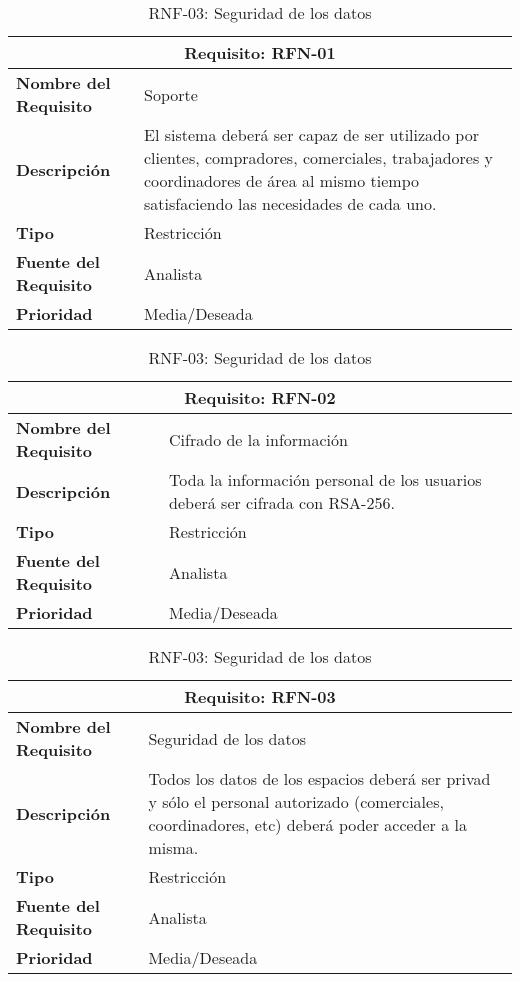\begin{table}[H]
\begin{table}[H]
\begin{center}
\begin{tabular}{p{} p{7cm}}
\multicolumn{2}{c}{\textbf{Requisito: RFN-01} } \\
\hline \hline
\textbf{Nombre del Requisito} & Soporte  \\
\hline
\textbf{Descripción} & El sistema deberá ser capaz de ser utilizado por clientes, compradores, comerciales, trabajadores y coordinadores de área al mismo tiempo satisfaciendo las necesidades de cada uno. \\
\hline
\textbf{Tipo} & Restricción \\
\hline
\textbf{Fuente del Requisito} &  Analista \\
\hline
\textbf{Prioridad} &  Media/Deseada \\ \hline
\end{tabular}
\caption{RNF-01: Soporte}
\label{tab:RFN-01}
\end{center}
\end{table}

\begin{table}[H]
\begin{center}
\begin{tabular}{p{} p{7cm}}
\multicolumn{2}{c}{\textbf{Requisito: RFN-02} } \\
\hline \hline
\textbf{Nombre del Requisito} & Cifrado de la información  \\
\hline
\textbf{Descripción} & Toda la información personal de los usuarios deberá ser cifrada con RSA-256.\\
\hline
\textbf{Tipo} & Restricción \\
\hline
\textbf{Fuente del Requisito} &  Analista \\
\hline
\textbf{Prioridad} &  Media/Deseada \\ \hline
\end{tabular}
\caption{RNF-02: Cifrado de la información}
\label{tab:RFN-02}
\end{center}
\end{table}

\begin{table}[H]
\begin{center}
\begin{tabular}{p{} p{7cm}}
\multicolumn{2}{c}{\textbf{Requisito: RFN-03} } \\
\hline \hline
\textbf{Nombre del Requisito} & Seguridad de los datos  \\
\hline
\textbf{Descripción} & Todos los datos de los espacios deberá ser privad y sólo el personal autorizado (comerciales, coordinadores, etc) deberá poder acceder a la misma. \\
\hline
\textbf{Tipo} & Restricción \\
\hline
\textbf{Fuente del Requisito} &  Analista \\
\hline
\textbf{Prioridad} &  Media/Deseada \\ \hline
\end{tabular}
\caption{RNF-03: Seguridad de los datos}
\label{tab:RFN-03}
\end{center}
\end{table}


\end{table}
